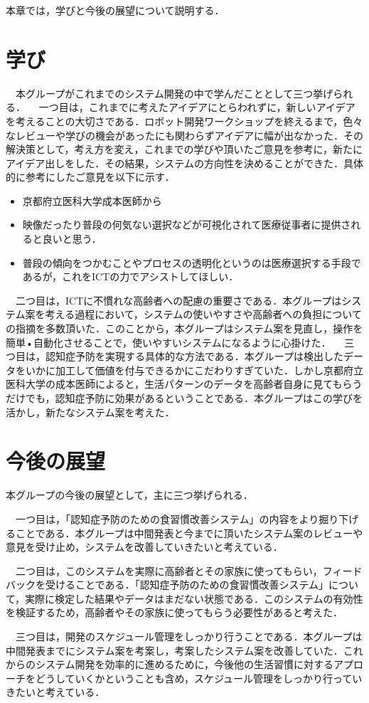 \documentclass[../report]{subfiles}
\begin{document}
本章では，学びと今後の展望について説明する．

\section{学び}
　本グループがこれまでのシステム開発の中で学んだこととして三つ挙げられる．
　一つ目は，これまでに考えたアイデアにとらわれずに，新しいアイデアを考えることの大切さである．ロボット開発ワークショップを終えるまで，色々なレビューや学びの機会があったにも関わらずアイデアに幅が出なかった．その解決策として，考え方を変え，これまでの学びや頂いたご意見を参考に，新たにアイデア出しをした．その結果，システムの方向性を決めることができた．具体的に参考にしたご意見を以下に示す．

\begin{itemize}
    \item[] 京都府立医科大学成本医師から
    \item 映像だったり普段の何気ない選択などが可視化されて医療従事者に提供されると良いと思う．
    \item 普段の傾向をつかむことやプロセスの透明化というのは医療選択する手段であるが，これをICTの力でアシストしてほしい．
\end{itemize}


　二つ目は，ICTに不慣れな高齢者への配慮の重要さである．本グループはシステム案を考える過程において，システムの使いやすさや高齢者への負担についての指摘を多数頂いた．このことから，本グループはシステム案を見直し，操作を簡単•自動化させることで，使いやすいシステムになるように心掛けた．
　三つ目は，認知症予防を実現する具体的な方法である．本グループは検出したデータをいかに加工して価値を付与できるかにこだわりすぎていた．しかし京都府立医科大学の成本医師によると，生活パターンのデータを高齢者自身に見てもらうだけでも，認知症予防に効果があるということである．本グループはこの学びを活かし，新たなシステム案を考えた．


\section{今後の展望}
本グループの今後の展望として，主に三つ挙げられる．

　一つ目は，｢認知症予防のための食習慣改善システム」の内容をより掘り下げることである．本グループは中間発表と今までに頂いたシステム案のレビューや意見を受け止め，システムを改善していきたいと考えている．

　二つ目は，このシステムを実際に高齢者とその家族に使ってもらい，フィードバックを受けることである．｢認知症予防のための食習慣改善システム」について，実際に検定した結果やデータはまだない状態である．このシステムの有効性を検証するため，高齢者やその家族に使ってもらう必要性があると考えた．

　三つ目は，開発のスケジュール管理をしっかり行うことである．本グループは中間発表までにシステム案を考案し，考案したシステム案を改善していた．これからのシステム開発を効率的に進めるために，今後他の生活習慣に対するアプローチをどうしていくかということも含め，スケジュール管理をしっかり行っていきたいと考えている．
\end{document}
